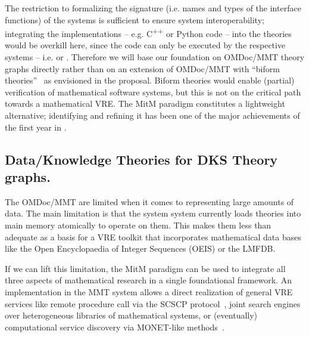 The restriction to formalizing the signature (i.e. names and types of the interface
functions) of the systems is sufficient to ensure system interoperability; integrating the
implementations -- e.g. C\textsuperscript{++} or Python code -- into the theories would
be overkill here, since the code can only be executed by the respective systems --
i.e. \GAP or \SageMath. Therefore we will base our foundation on OMDoc/MMT theory graphs
directly rather than on an extension of OMDoc/MMT with ``biform
theories''~\cite{KohManRab:aumftg13,Farmer:btc07} as envisioned in the proposal. Biform
theories would enable (partial) verification of mathematical software systems, but this is
not on the critical path towards a mathematical VRE. The MitM paradigm constitutes a
lightweight alternative; identifying and refining it has been one of the major
achievements of the first year in .


\subsection{Data/Knowledge Theories for DKS Theory graphs.}\label{sec:introfinal}

The OMDoc/MMT are limited when it comes to representing large amounts of data. The main
limitation is that the system \MMT system currently loads theories into main memory
atomically to operate on them. This makes them less than adequate as a basis for a VRE
toolkit that incorporates mathematical data bases like the Open Encyclopaedia of Integer
Sequences (OEIS) or the LMFDB.

If we can lift this limitation, the MitM paradigm can be used to integrate all three
aspects of mathematical research in a single foundational framework. An implementation in
the MMT system allows a direct realization of general VRE services like remote procedure
call via the SCSCP protocol~\cite{SCSCP,FHKLR:SCSCP08,HorRoz:ossp09}, joint search engines
over heterogeneous libraries of mathematical systems, or (eventually) computational
service discovery via MONET-like methods~\cite{aird-et-al:2005}.


